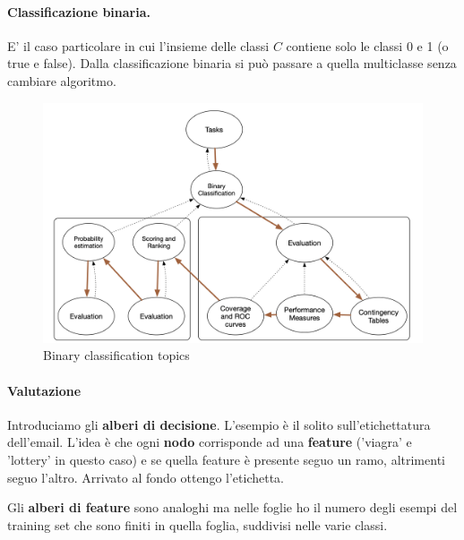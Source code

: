 \paragraph{Classificazione binaria.} E' il caso particolare in cui l'insieme delle classi $C$ contiene solo le classi 0 e 1 (o true e false).
Dalla classificazione binaria si può passare a quella multiclasse senza cambiare algoritmo.
\begin{figure}
    \centering
    \includegraphics[scale=0.2]{images/binClassifier.png}
    \caption{Binary classification topics}
    \label{fig:enter-label}
\end{figure}

\newpage

\paragraph{Valutazione} Introduciamo gli \textbf{alberi di decisione}. L'esempio è il solito sull'etichettatura dell'email. L'idea è che ogni \textbf{nodo} corrisponde ad una \textbf{feature} ('viagra' e 'lottery' in questo caso) e se quella feature è presente seguo un ramo, altrimenti seguo l'altro. Arrivato al fondo ottengo l'etichetta.

Gli \textbf{alberi di feature} sono analoghi ma nelle foglie ho il numero degli esempi del training set che sono finiti in quella foglia, suddivisi nelle varie classi.

